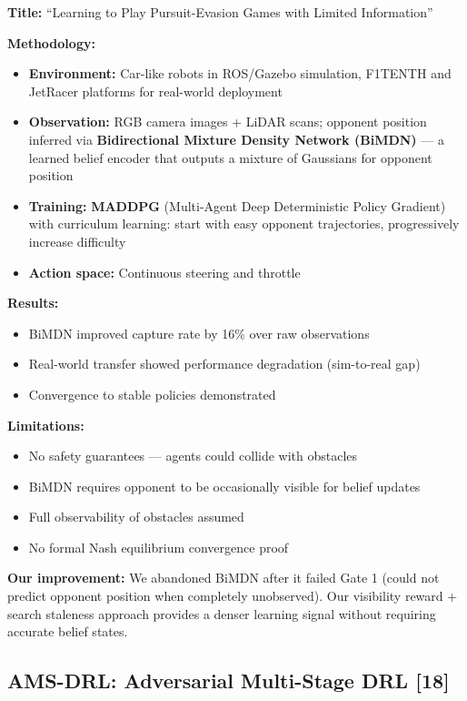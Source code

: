 \documentclass[11pt,a4paper]{report}
\begin{document}
\textbf{Title:} ``Learning to Play Pursuit-Evasion Games with Limited Information''

\textbf{Methodology:}
\begin{itemize}
    \item \textbf{Environment:} Car-like robots in ROS/Gazebo simulation, F1TENTH and JetRacer platforms for real-world deployment
    \item \textbf{Observation:} RGB camera images + LiDAR scans; opponent position inferred via \textbf{Bidirectional Mixture Density Network (BiMDN)} --- a learned belief encoder that outputs a mixture of Gaussians for opponent position
    \item \textbf{Training:} \textbf{MADDPG} (Multi-Agent Deep Deterministic Policy Gradient) with curriculum learning: start with easy opponent trajectories, progressively increase difficulty
    \item \textbf{Action space:} Continuous steering and throttle
\end{itemize}

\textbf{Results:}
\begin{itemize}
    \item BiMDN improved capture rate by 16\% over raw observations
    \item Real-world transfer showed performance degradation (sim-to-real gap)
    \item Convergence to stable policies demonstrated
\end{itemize}

\textbf{Limitations:}
\begin{itemize}
    \item No safety guarantees --- agents could collide with obstacles
    \item BiMDN requires opponent to be occasionally visible for belief updates
    \item Full observability of obstacles assumed
    \item No formal Nash equilibrium convergence proof
\end{itemize}

\textbf{Our improvement:} We abandoned BiMDN after it failed Gate 1 (could not predict opponent position when completely unobserved). Our visibility reward + search staleness approach provides a denser learning signal without requiring accurate belief states.

\subsection{AMS-DRL: Adversarial Multi-Stage DRL [18]}
\end{document}
